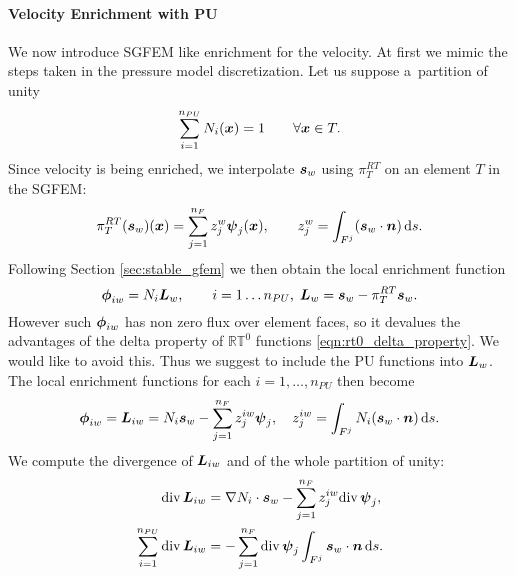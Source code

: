\paragraph{Velocity Enrichment with PU}
We now introduce SGFEM like enrichment for the velocity.
At first we mimic the steps taken in the pressure model discretization.
Let us suppose a~partition of unity
\begin{equation}
    \sum\limits_{i=1}^{n_{PU}} N_i(\mathbf{\boldsymbol{x}}) = 1 \qquad \forall \mathbf{\boldsymbol{x}}\in T.
\end{equation}
Since velocity is being enriched, we interpolate $\mathbf{\boldsymbol{s}}_w$ using $\pi^{RT}_T$ on an element $T$ in the SGFEM:
\begin{equation}
    \pi^{RT}_T(\mathbf{\boldsymbol{s}}_w)(\mathbf{\boldsymbol{x}}) = \sum \limits_{j=1}^{n_F} z^w_j \mathbf{\boldsymbol{\psi}}_j(\mathbf{\boldsymbol{x}}),
    \qquad z^w_j=\int_{F^j} (\mathbf{\boldsymbol{s}}_w\cdot \mathbf{\boldsymbol{n}})\,{\rm d} s \label{eqn:sgfem_interpolant_vel}.
\end{equation}
Following Section \ref{sec:stable_gfem} we then obtain the local enrichment function
\begin{equation}
    \mathbf{\boldsymbol{\phi}}_{iw}=N_i\mathbf{\boldsymbol{L}}_{w}, \qquad i=1\ldots n_{PU},\;\mathbf{\boldsymbol{L}}_{w}=\mathbf{\boldsymbol{s}}_w - \pi^{RT}_T\mathbf{\boldsymbol{s}}_w.
\end{equation}
However such $\mathbf{\boldsymbol{\phi}}_{iw}$ has non zero flux over element faces, so it devalues
the advantages of the delta property of $\mathbb{RT}^0$ functions \eqref{eqn:rt0_delta_property}.
We would like to avoid this.
Thus we suggest to include the PU functions into $\mathbf{\boldsymbol{L}}_w$.
The local enrichment functions for each $i=1,\ldots,n_{PU}$ then become
\begin{equation}
    \mathbf{\boldsymbol{\phi}}_{iw} = \mathbf{\boldsymbol{L}}_{iw} = N_i\mathbf{\boldsymbol{s}}_w - \sum \limits_{j=1}^{n_F} z^{iw}_j \mathbf{\boldsymbol{\psi}}_j,
    \quad z^{iw}_j=\int_{F^j} N_i (\mathbf{\boldsymbol{s}}_w\cdot \mathbf{\boldsymbol{n}})\,{\rm d} s \label{eqn:local_enr_vel_PU}.
\end{equation}
We compute the divergence of $\mathbf{\boldsymbol{L}}_{iw}$ and of the whole partition of unity:
\begin{align}
    {\rm div}\,\mathbf{\boldsymbol{L}}_{iw} &= \nabla N_i \cdot \mathbf{\boldsymbol{s}}_w - \sum \limits_{j=1}^{n_F} z^{iw}_j {\rm div}\,\mathbf{\boldsymbol{\psi}}_j
    \label{eqn:local_enr_vel_div}, \\
    \sum \limits_{i=1}^{n_{PU}} {\rm div}\,\mathbf{\boldsymbol{L}}_{iw} &= - \sum \limits_{j=1}^{n_F} {\rm div}\,\mathbf{\boldsymbol{\psi}}_j \int_{F^j} \mathbf{\boldsymbol{s}}_w\cdot\mathbf{\boldsymbol{n}} \,{\rm d} s.
    \label{eqn:local_enr_vel_sum_div_PU}
\end{align}
